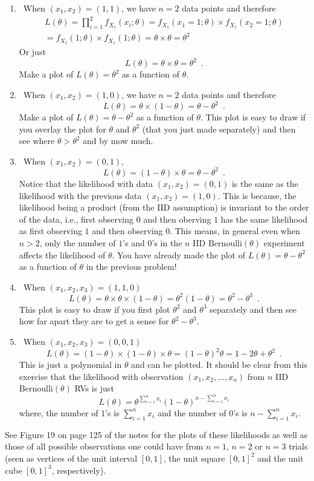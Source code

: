\begin{Answer}
\begin{enumerate}
\item~When $(x_1,x_2)=(1,1)$, we have $n=2$ data points and therefore
\begin{multline*}
L(\theta)= \prod_{i=1}^2 f_{X_1}(x_i;\theta) = f_{X_1}(x_1=1;\theta) \times f_{X_1}(x_2=1;\theta) \\
= f_{X_1}(1;\theta)\times f_{X_1}(1;\theta) = \theta \times \theta = \theta^2
\end{multline*}
Or just
\[
L(\theta) = \theta \times \theta = \theta^2 \enspace .
\]
Make a plot of $L(\theta)=\theta^2$ as a function of $\theta$.
\item~When $(x_1,x_2)=(1,0)$, we have $n=2$ data points and therefore
\[
L(\theta) = \theta \times (1-\theta)  = \theta  - \theta^2 \enspace .
\]
Make a plot of $L(\theta)=\theta-\theta^2$ as a function of $\theta$.
This plot is easy to draw if you overlay the plot for $\theta$ and $\theta^2$ (that you just made separately) and then see where $\theta > \theta^2$ and by mow much.
\item~When $(x_1,x_2)=(0,1)$,
\[
L(\theta) = (1-\theta) \times \theta  = \theta  - \theta^2 \enspace .
\]
Notice that the likelihood with data $(x_1,x_2)=(0,1)$ is the same as the likelihood with the previous data $(x_1,x_2)=(1,0)$.  
This is because, the likelihood being a product (from the IID assumption) is invariant to the order of the data, i.e., first observing $0$ and then oberving $1$ has the same likelihood as first observing $1$ and then observing $0$.  
This means, in general even when $n>2$, only the number of $1$'s and $0$'s in the $n$ IID $\mathrm{Bernoulli}(\theta)$ experiment affects the likelihood of $\theta$.       
You have already made the plot of $L(\theta)=\theta-\theta^2$ as a function of $\theta$ in the previous problem!
\item~When $(x_1,x_2,x_3)=(1,1,0)$
\[
L(\theta) = \theta \times \theta \times (1-\theta)  = \theta^2  (1-\theta) = \theta^2-\theta^3 \enspace .
\]
This plot is easy to draw if you first plot $\theta^2$ and $\theta^3$ separately and then see how far apart they are to get a sense for $\theta^2-\theta^3$.
\item~When $(x_1,x_2,x_3)=(0,0,1)$
\[
L(\theta) = (1-\theta) \times (1-\theta) \times \theta  = (1-\theta)^2  \theta = 1-2\theta+\theta^2 \enspace .
\]
This is just a polynomial in $\theta$ and can be plotted.  It should be clear from this exercise that the likelihood with observation $(x_1,x_2,\ldots,x_n)$ from $n$ IID $\mathrm{Bernoulli}(\theta)$ RVs is just 
$$L(\theta) = \theta^{\sum_{i=1}^{n}x_i}  (1-\theta)^{n-\sum_{i=1}^{n}x_i}$$
where, the number of $1$'s is $\sum_{i=1}^{n}x_i$ and the number of $0$'s is $n-\sum_{i=1}^{n}x_i$.
\end{enumerate}

See Figure 19 on page 125 of the notes for the plots of these likelihoods as well as those of all possible observations one could have from $n=1$, $n=2$ or $n=3$ trials (seen as vertices of the unit interval $[0,1]$, the unit square $[0,1]^2$ and the unit cube $[0,1]^3$, respectively).
\end{Answer}

